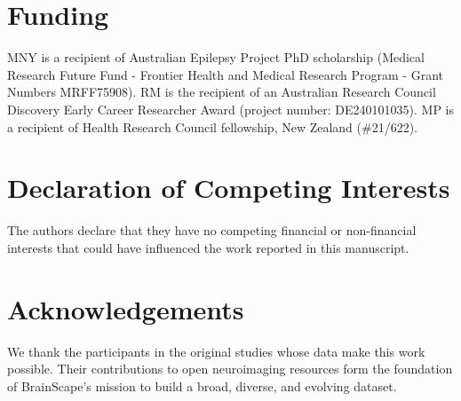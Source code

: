 \section*{Funding}

MNY is a recipient of Australian Epilepsy Project PhD scholarship 
(Medical Research Future Fund - Frontier Health and Medical Research Program - 
Grant Numbers MRFF75908). 
RM is the recipient of an Australian Research Council Discovery Early Career 
Researcher Award (project number: DE240101035). 
MP is a recipient of Health Research Council fellowship, New Zealand (\#21/622).

\section*{Declaration of Competing Interests}

The authors declare that they have no competing financial or non-financial interests 
that could have influenced the work reported in this manuscript.

\section*{Acknowledgements}

We thank the participants in the original studies whose data make this work possible. 
Their contributions to open neuroimaging resources form the foundation of BrainScape's 
mission to build a broad, diverse, and evolving dataset.
